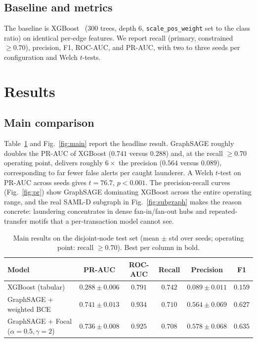 \documentclass[conference]{IEEEtran}
\begin{document}
\subsection{Baseline and metrics}
The baseline is XGBoost~\cite{chen2016xgboost} ($300$ trees, depth $6$, \texttt{scale\_pos\_weight} set to
the class ratio) on identical per-edge features. We report recall (primary, constrained $\geq 0.70$),
precision, F1, ROC-AUC, and PR-AUC, with two to three seeds per configuration and Welch $t$-tests.

\section{Results}
\subsection{Main comparison}
Table~\ref{tab:main} and Fig.~\ref{fig:main} report the headline result. GraphSAGE roughly doubles the
PR-AUC of XGBoost ($0.741$ versus $0.288$) and, at the recall $\geq 0.70$ operating point, delivers roughly
$6\times$ the precision ($0.564$ versus $0.089$), corresponding to far fewer false alerts per caught
launderer. A Welch $t$-test on PR-AUC across seeds gives $t = 76.7$, $p < 0.001$. The precision-recall
curves (Fig.~\ref{fig:pr}) show GraphSAGE dominating XGBoost across the entire operating range, and the real
SAML-D subgraph in Fig.~\ref{fig:subgraph} makes the reason concrete: laundering concentrates in dense
fan-in/fan-out hubs and repeated-transfer motifs that a per-transaction model cannot see.

\begin{table}[t]
\caption{Main results on the disjoint-node test set (mean $\pm$ std over seeds; operating point: recall
$\geq 0.70$). Best per column in bold.}
\label{tab:main}
\centering
\begin{tabular}{lccccc}
\toprule
Model & PR-AUC & ROC-AUC & Recall & Precision & F1 \\
\midrule
XGBoost (tabular) & $0.288 \pm 0.006$ & $0.791$ & $0.742$ & $0.089 \pm 0.011$ & $0.159$ \\
GraphSAGE + weighted BCE & $\mathbf{0.741 \pm 0.013}$ & $\mathbf{0.934}$ & $0.710$ & $0.564 \pm 0.069$ & $0.627$ \\
GraphSAGE + Focal ($\alpha{=}0.5, \gamma{=}2$) & $0.736 \pm 0.008$ & $0.925$ & $0.708$ & $\mathbf{0.578 \pm 0.068}$ & $\mathbf{0.635}$ \\
\bottomrule
\end{tabular}
\end{table}
\end{document}
